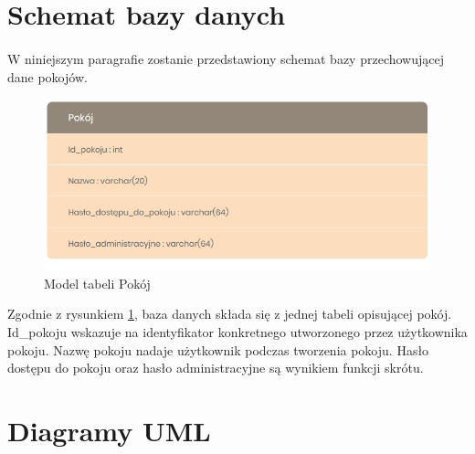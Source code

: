 \documentclass[12pt,a4paper,notitlepage]{report}
\begin{document}
	\section{Schemat bazy danych} 
	\paragraph{} W niniejszym paragrafie zostanie przedstawiony schemat bazy przechowującej dane pokojów.
	\begin{figure}[h]
		\centering
		\includegraphics[scale=0.7]{BD}
		\caption[]{Model tabeli Pokój}
		\label{fig:BD}
	\end{figure}

	Zgodnie z rysunkiem \ref{fig:BD}, baza danych składa się z jednej tabeli opisującej pokój. Id\_pokoju wskazuje na identyfikator konkretnego utworzonego przez użytkownika pokoju. Nazwę pokoju nadaje użytkownik podczas tworzenia pokoju. Hasło dostępu do pokoju oraz hasło administracyjne są wynikiem funkcji skrótu. 
	\section{Diagramy UML}
\end{document}
